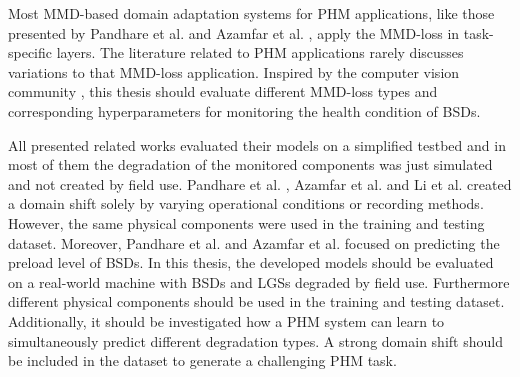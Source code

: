 Most MMD-based domain adaptation systems for PHM applications, like those presented by Pandhare et al. \cite{Pandhare2021} and Azamfar et al. \cite{AZAMFAR2020103932}, apply the MMD-loss in task-specific layers. The literature related to PHM applications rarely discusses variations to that MMD-loss application. Inspired by the computer vision community \cite{li2020} \cite{Aljundi2016}, this thesis should evaluate different MMD-loss types and corresponding hyperparameters for monitoring the health condition of BSDs.

All presented related works evaluated their models on a simplified testbed and in most of them the degradation of the monitored components was just simulated and not created by field use. Pandhare et al. \cite{Pandhare2021}, Azamfar et al. \cite{AZAMFAR2020103932} and Li et al. \cite{Li2018} created a domain shift solely by varying operational conditions or recording methods. However, the same physical components were used in the training and testing dataset. Moreover, Pandhare et al. \cite{Pandhare2021} and Azamfar et al. \cite{AZAMFAR2020103932} focused on predicting the preload level of BSDs. In this thesis, the developed models should be evaluated on a real-world machine with BSDs and LGSs degraded by field use. Furthermore different physical components should be used in the training and testing dataset. Additionally, it should be investigated how a PHM system can learn to simultaneously predict different degradation types. A strong domain shift should be included in the dataset to generate a challenging PHM task. 

